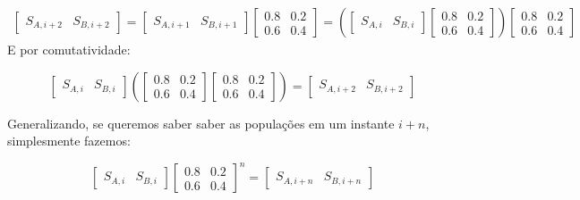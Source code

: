 \documentclass[12pt]{article}
\begin{document}
\begin{align*}
\begin{bmatrix}
S_{A, i+2} & S_{B, i+2}
\end{bmatrix} 
=
\begin{bmatrix}
S_{A, i+1} & S_{B, i+1}
\end{bmatrix}
\begin{bmatrix}
0.8 & 0.2\\
0.6 & 0.4
\end{bmatrix}
=
\left(
\begin{bmatrix}
S_{A, i} & S_{B, i}
\end{bmatrix}
\begin{bmatrix}
0.8 & 0.2\\
0.6 & 0.4
\end{bmatrix}
\right)
\begin{bmatrix}
0.8 & 0.2\\
0.6 & 0.4
\end{bmatrix}
\end{align*}
E por comutatividade:

$$
\begin{bmatrix}
S_{A, i} & S_{B, i}
\end{bmatrix}
\left(
\begin{bmatrix}
0.8 & 0.2\\
0.6 & 0.4
\end{bmatrix}
\begin{bmatrix}
0.8 & 0.2\\
0.6 & 0.4
\end{bmatrix}
\right)
=
\begin{bmatrix}
S_{A, i+2} & S_{B, i+2}
\end{bmatrix}
$$

Generalizando, se queremos saber saber as populações em um instante $i + n$, simplesmente fazemos:

\begin{equation}
\begin{bmatrix}
S_{A, i} & S_{B, i}
\end{bmatrix}
\begin{bmatrix}
0.8 & 0.2\\
0.6 & 0.4
\end{bmatrix}^n
=
\begin{bmatrix}
S_{A, i+n} & S_{B, i+n}
\end{bmatrix}
\end{equation}
\end{document}
